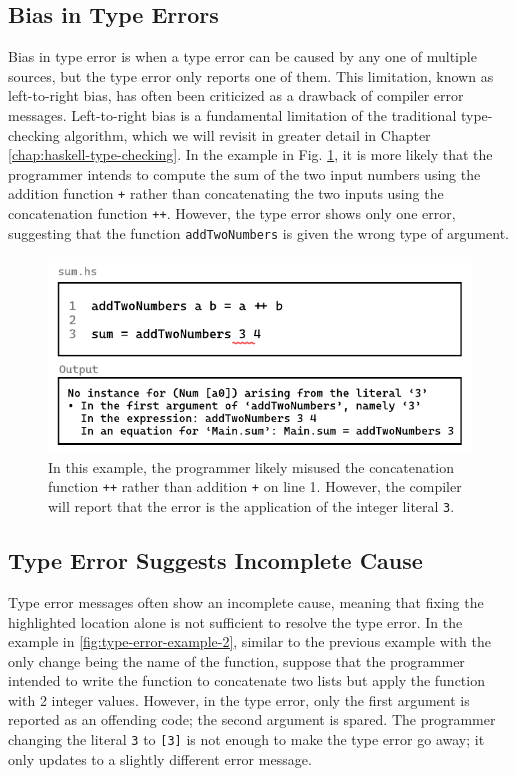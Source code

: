  \subsection{Bias in Type Errors} 
 \label{subsec:bias}
 Bias in type error is when a type error can be caused by any one of multiple sources, but the type error only reports one of them. This limitation, known as left-to-right bias, has often been criticized \cite{McAdam2002-vb, Lee1998-fx, Chen2014-ev} as a drawback of compiler error messages. Left-to-right bias is a fundamental limitation of the traditional type-checking algorithm, which we will revisit in greater detail in Chapter \ref{chap:haskell-type-checking}. In the example in Fig. \ref{fig:type-error-example}, it is more likely that the programmer intends to compute the sum of the two input numbers using the addition function \texttt{+} rather than concatenating the two inputs using the concatenation function \texttt{++}. However, the type error shows only one error, suggesting that the function \texttt{addTwoNumbers} is given the wrong type of argument. 

 \begin{figure}[hbt]
  \includegraphics[width=\linewidth]{TypeErrorExample}
  \caption{
    \label{fig:type-error-example}
  In this example, the programmer likely misused the concatenation function \texttt{++} rather than addition \texttt{+} on line 1. However, the compiler will report that the error is the application of the integer literal \texttt{3}.
    }
\end{figure}


\subsection{Type Error Suggests Incomplete Cause}
\label{subsec:imcomplete}

Type error messages often show an incomplete cause, meaning that fixing the highlighted location alone is not sufficient to resolve the type error. In the example in \ref{fig:type-error-example-2}, similar to the previous example with the only change being the name of the function, suppose that the programmer intended to write the function to concatenate two lists but apply the function with 2 integer values. However, in the type error, only the first argument is reported as an offending code; the second argument is spared. The programmer changing the literal \texttt{3} to \texttt{[3]} is not enough to make the type error go away; it only updates to a slightly different error message. 


